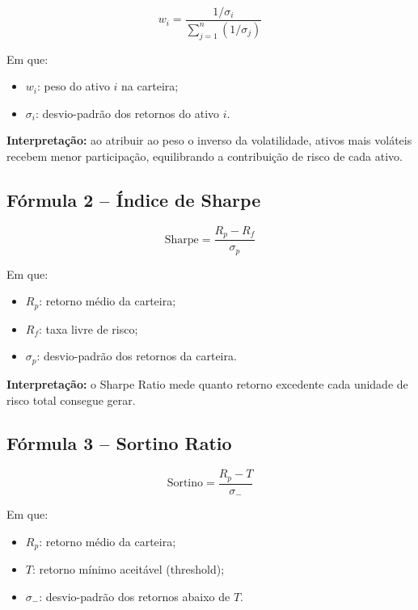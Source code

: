 \begin{equation}
w_i = \frac{1/\sigma_i}{\sum_{j=1}^{n}(1/\sigma_j)}
\end{equation}

Em que:
\begin{itemize}
    \item $w_i$: peso do ativo $i$ na carteira;
    \item $\sigma_i$: desvio-padrão dos retornos do ativo $i$.
\end{itemize}

\textbf{Interpretação:} ao atribuir ao peso o inverso da volatilidade, ativos mais voláteis recebem menor participação, equilibrando a contribuição de risco de cada ativo.

\subsection{Fórmula 2 -- Índice de Sharpe}

\begin{equation}
\text{Sharpe} = \frac{R_p - R_f}{\sigma_p}
\end{equation}

Em que:
\begin{itemize}
    \item $R_p$: retorno médio da carteira;
    \item $R_f$: taxa livre de risco;
    \item $\sigma_p$: desvio-padrão dos retornos da carteira.
\end{itemize}

\textbf{Interpretação:} o Sharpe Ratio mede quanto retorno excedente cada unidade de risco total consegue gerar.

\subsection{Fórmula 3 -- Sortino Ratio}

\begin{equation}
\text{Sortino} = \frac{R_p - T}{\sigma_-}
\end{equation}

Em que:
\begin{itemize}
    \item $R_p$: retorno médio da carteira;
    \item $T$: retorno mínimo aceitável (threshold);
    \item $\sigma_-$: desvio-padrão dos retornos abaixo de $T$.
\end{itemize}

